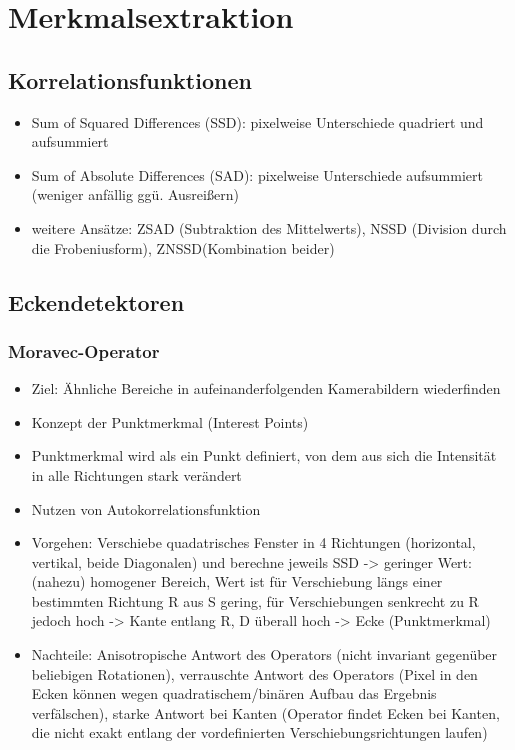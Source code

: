 \documentclass[paper=a4, fontsize=11pt]{scrartcl} %
\numberwithin{equation}{section} %
\numberwithin{figure}{section} %
\numberwithin{table}{section} %
\begin{document}
\section{Merkmalsextraktion}

\subsection{Korrelationsfunktionen}

\begin{itemize}
\item Sum of Squared Differences (SSD): pixelweise Unterschiede quadriert und aufsummiert
\item Sum of Absolute Differences (SAD): pixelweise Unterschiede aufsummiert (weniger anfällig ggü. Ausreißern)
\item weitere Ansätze: ZSAD (Subtraktion des Mittelwerts), NSSD (Division durch die Frobeniusform), ZNSSD(Kombination beider)
\end{itemize}

\subsection{Eckendetektoren}

\subsubsection{Moravec-Operator}

\begin{itemize}
\item Ziel: Ähnliche Bereiche in aufeinanderfolgenden Kamerabildern wiederfinden
\item Konzept der Punktmerkmal (Interest Points)
\item Punktmerkmal wird als ein Punkt definiert, von dem aus sich die Intensität in alle Richtungen stark verändert
\item Nutzen von Autokorrelationsfunktion
\item Vorgehen: Verschiebe quadatrisches Fenster in 4 Richtungen (horizontal, vertikal, beide Diagonalen) und berechne jeweils SSD -> geringer Wert: (nahezu) homogener Bereich, Wert ist für Verschiebung längs einer bestimmten Richtung R aus S gering, für Verschiebungen senkrecht zu R jedoch hoch -> Kante entlang R, D überall hoch -> Ecke (Punktmerkmal)
\item Nachteile: Anisotropische Antwort des Operators (nicht invariant gegenüber beliebigen Rotationen), verrauschte Antwort des Operators (Pixel in den Ecken können wegen quadratischem/binären Aufbau das Ergebnis verfälschen), starke Antwort bei Kanten (Operator findet Ecken bei Kanten, die nicht exakt entlang der vordefinierten Verschiebungsrichtungen laufen)
\end{itemize}
\end{document}

